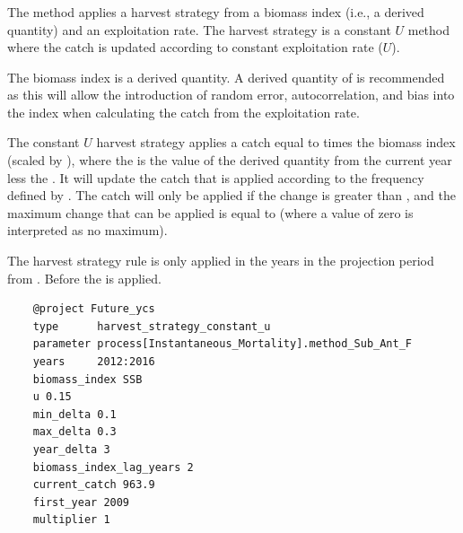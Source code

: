 \subsubsection{} \label{sec:Project-HarvestStrategyConstantU} 

The  method applies a harvest strategy from a biomass index (i.e., a derived quantity) and an exploitation rate. The harvest strategy is a constant $U$ method where the catch is updated according to constant exploitation rate ($U$).

The biomass index is a derived quantity. A derived quantity of  is recommended as this will allow the introduction of random error, autocorrelation, and bias into the index when calculating the catch from the exploitation rate.

The constant $U$ harvest strategy applies a catch equal to  times the biomass index (scaled by ), where the  is the value of the derived quantity from the current year less the . It will update the catch that is applied according to the frequency defined by . The catch will only be applied if the change is greater than , and the maximum change that can be applied is equal to  (where a value of zero is interpreted as no maximum). 

The harvest strategy rule is only applied in the years in the projection period from . Before  the  is applied.

{\small{\begin{verbatim}
	@project Future_ycs
	type      harvest_strategy_constant_u
	parameter process[Instantaneous_Mortality].method_Sub_Ant_F
	years     2012:2016
	biomass_index SSB
	u 0.15
	min_delta 0.1
	max_delta 0.3
	year_delta 3
	biomass_index_lag_years 2
	current_catch 963.9
	first_year 2009
	multiplier 1
\end{verbatim}}}

\subsubsection{}  
 \label{sec:Project-HarvestStrategyRampU} 

